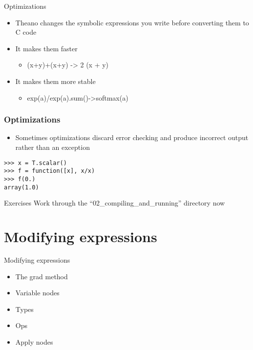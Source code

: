 \documentclass[utf8x,xcolor=pdftex,dvipsnames,table]{beamer}
\begin{document}
\begin{frame}{Optimizations}
  \begin{itemize}
  \item Theano changes the symbolic expressions
    you write before converting them to C code
  \item It makes them faster
  \begin{itemize}
  \item (x+y)+(x+y) -> 2 (x + y)
  \end{itemize}
  \item It makes them more stable
  \begin{itemize}
  \item exp(a)/exp(a).sum()->softmax(a)
  \end{itemize}
  \end{itemize}
\end{frame}

\begin{frame}[fragile]
  \frametitle{Optimizations}

  \begin{itemize}
  \item Sometimes optimizations discard error
    checking and produce incorrect output
    rather than an exception
  \end{itemize}
\begin{lstlisting}
>>> x = T.scalar()
>>> f = function([x], x/x)
>>> f(0.)
array(1.0)
\end{lstlisting}

\end{frame}

\begin{frame}{Exercises}
Work through the ``02\_compiling\_and\_running'' directory now
\end{frame}

\section{Modifying expressions}
\begin{frame}{Modifying expressions}
  \begin{itemize}
  \item The grad method
  \item Variable nodes
  \item Types
  \item Ops
  \item Apply nodes
  \end{itemize}
\end{frame}
\end{document}
